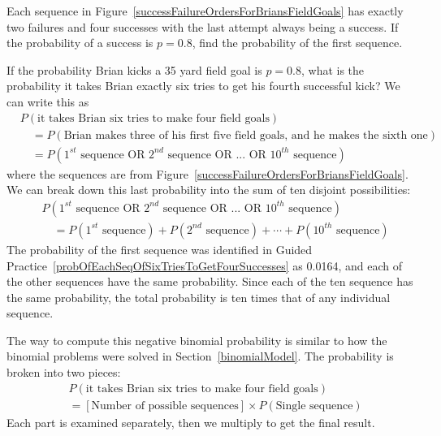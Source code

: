 \begin{exercisewrap}
\begin{nexercise} \label{probOfEachSeqOfSixTriesToGetFourSuccesses}
Each sequence in Figure~\ref{successFailureOrdersForBriansFieldGoals} has exactly two failures and four successes with the last attempt always being a success. If the probability of a success is $p=0.8$, find the probability of the first sequence.\footnotemark
\end{nexercise}
\end{exercisewrap}

If the probability Brian kicks a 35 yard field goal is $p=0.8$, what is the probability it takes Brian exactly six tries to get his fourth successful kick? We can write this as
{\small\begin{align*}
&P(\text{it takes Brian six tries to make four field goals}) \\
& \quad = P(\text{Brian makes three of his first five field goals, and he makes the sixth one}) \\
& \quad = P(\text{$1^{st}$ sequence OR $2^{nd}$ sequence OR ... OR $10^{th}$ sequence})
\end{align*}
}where the sequences are from Figure~\ref{successFailureOrdersForBriansFieldGoals}. We can break down this last probability into the sum of ten disjoint possibilities:
{\small\begin{align*}
&P(\text{$1^{st}$ sequence OR $2^{nd}$ sequence OR ... OR $10^{th}$ sequence}) \\
&\quad = P(\text{$1^{st}$ sequence}) + P(\text{$2^{nd}$ sequence}) + \cdots + P(\text{$10^{th}$ sequence})
\end{align*}
}The probability of the first sequence was identified in Guided Practice~\ref{probOfEachSeqOfSixTriesToGetFourSuccesses} as 0.0164, and each of the other sequences have the same probability. Since each of the ten sequence has the same probability, the total probability is ten times that of any individual sequence.

The way to compute this negative binomial probability is similar to how the binomial problems were solved in Section~\ref{binomialModel}. The probability is broken into two pieces:
\begin{align*}
&P(\text{it takes Brian six tries to make four field goals}) \\
&= [\text{Number of possible sequences}] \times P(\text{Single sequence})
\end{align*}
Each part is examined separately, then we multiply to get the final result.


